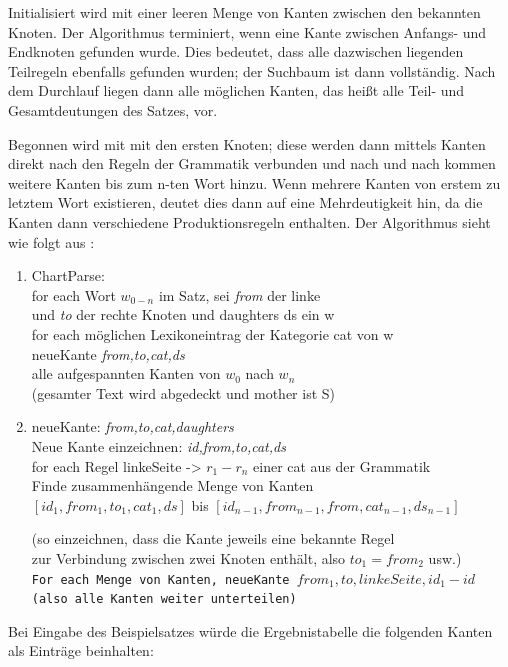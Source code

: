 \documentclass[12pt]{report}
\begin{document}
Initialisiert wird mit einer leeren Menge von Kanten zwischen den bekannten Knoten. Der Algorithmus terminiert, wenn eine Kante zwischen Anfangs- und Endknoten gefunden wurde. Dies bedeutet, dass alle dazwischen liegenden Teilregeln ebenfalls gefunden wurden; der Suchbaum ist dann vollständig. Nach dem Durchlauf liegen dann alle möglichen Kanten, das heißt alle Teil- und Gesamtdeutungen des Satzes, vor. 

Begonnen wird mit mit den ersten Knoten; diese werden dann mittels Kanten direkt nach den Regeln der Grammatik verbunden und nach und nach kommen weitere Kanten bis zum n-ten Wort hinzu. Wenn mehrere Kanten von erstem zu letztem Wort existieren, deutet dies dann auf eine Mehrdeutigkeit hin, da die Kanten dann verschiedene Produktionsregeln enthalten. Der Algorithmus sieht wie folgt aus \cite{cop04}:
\begin{enumerate} \tt
\item 
ChartParse: \\
for each Wort $w_{0-n}$ im Satz, sei \textit{from} der linke \\
und \textit{to} der rechte Knoten und daughters ds ein w \\
\hspace*{.2cm} for each möglichen Lexikoneintrag der Kategorie cat von w \\
\hspace*{.4cm} neueKante \textit{from,to,cat,ds} \\
 alle aufgespannten Kanten von $w_{0}$ nach $w_{n}$ \\ \rm(gesamter Text wird abgedeckt und mother ist S)\tt
\item 
neueKante: \textit{from,to,cat,daughters} \\
Neue Kante einzeichnen: \textit{id,from,to,cat,ds} \\
for each Regel linkeSeite -> $r_{1}-r_{n}$ einer cat aus der Grammatik \\
\hspace*{.2cm} Finde zusammenhängende Menge von Kanten \\
\hspace*{.2cm} $[id_{1},from_{1},to_{1},cat_{1},ds]$ bis $[id_{n-1},from_{n-1},from,cat_{n-1},ds_{n-1}]$ 

\rm(so einzeichnen, dass die Kante jeweils  eine bekannte Regel \\
zur Verbindung zwischen zwei Knoten enthält, also $to_{1}=from_{2}$ usw.)\tt \\
\hspace*{.2cm} For each Menge von Kanten, neueKante $from_{1},to,linkeSeite,id_{1}-id$ \rm(also alle Kanten weiter unterteilen)
\end{enumerate}
Bei Eingabe des Beispielsatzes würde die Ergebnistabelle die folgenden Kanten als Einträge beinhalten:
\end{document}
